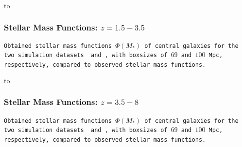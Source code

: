 {
    {\vbox to }
    \begin{frame}
        \frametitle{Stellar Mass Functions: $z=1.5-3.5$}
        \vspace{6.5cm}
        \tiny\texttt{Obtained stellar mass functions $\Phi(M_*)$ of central galaxies for the two simulation datasets \gsmall\ and \glarge, with boxsizes of $69$ and $100$ Mpc, respectively, compared to observed stellar mass functions.
        }
    \end{frame}
}


{
    {\vbox to }
    \begin{frame}
        \frametitle{Stellar Mass Functions: $z=3.5-8$}
        \vspace{6.5cm}
        \tiny\texttt{Obtained stellar mass functions $\Phi(M_*)$ of central galaxies for the two simulation datasets \gsmall\ and \glarge, with boxsizes of $69$ and $100$ Mpc, respectively, compared to observed stellar mass functions.
        }
    \end{frame}
}



